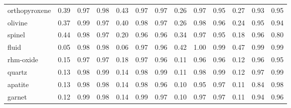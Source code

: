 \begin{table}[!htbp]
\begin{tabular}{@{}l|rrr|rrr|rrr|rrr@{}}
orthopyroxene & 0.39 & \cellcolor[RGB]{251,233,231}0.97 & \cellcolor[RGB]{253,244,243}0.98 & 0.43 & \cellcolor[RGB]{251,232,231}0.97 & \cellcolor[RGB]{252,235,234}0.97 & 0.26 & \cellcolor[RGB]{251,232,231}0.97 & \cellcolor[RGB]{249,221,218}0.95 & 0.27 & \cellcolor[RGB]{247,206,203}0.93 & \cellcolor[RGB]{250,224,222}0.95 \\
olivine & 0.37 & \cellcolor[RGB]{254,247,246}0.99 & \cellcolor[RGB]{252,237,236}0.97 & 0.40 & \cellcolor[RGB]{253,244,243}0.98 & \cellcolor[RGB]{251,232,231}0.97 & 0.26 & \cellcolor[RGB]{253,241,241}0.98 & \cellcolor[RGB]{250,225,224}0.96 & 0.24 & \cellcolor[RGB]{249,223,221}0.95 & \cellcolor[RGB]{248,214,212}0.94 \\
spinel & 0.44 & \cellcolor[RGB]{252,240,239}0.98 & \cellcolor[RGB]{252,236,235}0.97 & 0.20 & \cellcolor[RGB]{250,225,223}0.96 & \cellcolor[RGB]{250,225,224}0.96 & 0.34 & \cellcolor[RGB]{252,235,234}0.97 & \cellcolor[RGB]{250,223,221}0.95 & 0.18 & \cellcolor[RGB]{250,227,225}0.96 & \cellcolor[RGB]{232,122,114}0.80 \\
fluid & 0.05 & \cellcolor[RGB]{253,243,242}0.98 & \cellcolor[RGB]{253,241,240}0.98 & 0.06 & \cellcolor[RGB]{251,234,233}0.97 & \cellcolor[RGB]{251,230,229}0.96 & 0.42 & \cellcolor[RGB]{255,253,253}1.00 & \cellcolor[RGB]{254,250,250}0.99 & 0.47 & \cellcolor[RGB]{254,247,246}0.99 & \cellcolor[RGB]{254,250,250}0.99 \\
rhm-oxide & 0.15 & \cellcolor[RGB]{251,233,231}0.97 & \cellcolor[RGB]{251,233,231}0.97 & 0.18 & \cellcolor[RGB]{252,235,234}0.97 & \cellcolor[RGB]{250,228,226}0.96 & 0.11 & \cellcolor[RGB]{250,225,223}0.96 & \cellcolor[RGB]{251,231,230}0.96 & 0.12 & \cellcolor[RGB]{250,226,225}0.96 & \cellcolor[RGB]{249,219,217}0.95 \\
quartz & 0.13 & \cellcolor[RGB]{253,245,244}0.98 & \cellcolor[RGB]{254,247,247}0.99 & 0.14 & \cellcolor[RGB]{253,241,240}0.98 & \cellcolor[RGB]{254,249,249}0.99 & 0.11 & \cellcolor[RGB]{253,244,244}0.98 & \cellcolor[RGB]{254,250,250}0.99 & 0.12 & \cellcolor[RGB]{252,236,235}0.97 & \cellcolor[RGB]{253,245,244}0.99 \\
apatite & 0.13 & \cellcolor[RGB]{252,240,239}0.98 & \cellcolor[RGB]{252,240,239}0.98 & 0.14 & \cellcolor[RGB]{252,239,239}0.98 & \cellcolor[RGB]{251,229,228}0.96 & 0.10 & \cellcolor[RGB]{250,223,221}0.95 & \cellcolor[RGB]{252,237,236}0.97 & 0.11 & \cellcolor[RGB]{237,150,144}0.84 & \cellcolor[RGB]{253,242,242}0.98 \\
garnet & 0.12 & \cellcolor[RGB]{254,247,246}0.99 & \cellcolor[RGB]{253,242,241}0.98 & 0.14 & \cellcolor[RGB]{254,246,246}0.99 & \cellcolor[RGB]{251,233,232}0.97 & 0.10 & \cellcolor[RGB]{252,237,236}0.97 & \cellcolor[RGB]{251,234,232}0.97 & 0.11 & \cellcolor[RGB]{249,218,215}0.94 & \cellcolor[RGB]{250,226,225}0.96 \\

\end{tabular}
\end{table}
